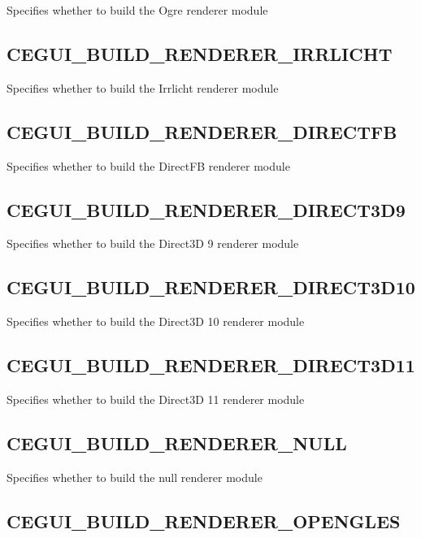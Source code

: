 Specifies whether to build the Ogre renderer module \hypertarget{build_options_build_options_irr_renderer}{}\subsection{C\+E\+G\+U\+I\+\_\+\+B\+U\+I\+L\+D\+\_\+\+R\+E\+N\+D\+E\+R\+E\+R\+\_\+\+I\+R\+R\+L\+I\+C\+HT}\label{build_options_build_options_irr_renderer}
Specifies whether to build the Irrlicht renderer module \hypertarget{build_options_build_options_dfb_renderer}{}\subsection{C\+E\+G\+U\+I\+\_\+\+B\+U\+I\+L\+D\+\_\+\+R\+E\+N\+D\+E\+R\+E\+R\+\_\+\+D\+I\+R\+E\+C\+T\+FB}\label{build_options_build_options_dfb_renderer}
Specifies whether to build the Direct\+FB renderer module \hypertarget{build_options_build_options_d3d9_renderer}{}\subsection{C\+E\+G\+U\+I\+\_\+\+B\+U\+I\+L\+D\+\_\+\+R\+E\+N\+D\+E\+R\+E\+R\+\_\+\+D\+I\+R\+E\+C\+T3\+D9}\label{build_options_build_options_d3d9_renderer}
Specifies whether to build the Direct3D 9 renderer module \hypertarget{build_options_build_options_d3d10_renderer}{}\subsection{C\+E\+G\+U\+I\+\_\+\+B\+U\+I\+L\+D\+\_\+\+R\+E\+N\+D\+E\+R\+E\+R\+\_\+\+D\+I\+R\+E\+C\+T3\+D10}\label{build_options_build_options_d3d10_renderer}
Specifies whether to build the Direct3D 10 renderer module \hypertarget{build_options_build_options_d3d11_renderer}{}\subsection{C\+E\+G\+U\+I\+\_\+\+B\+U\+I\+L\+D\+\_\+\+R\+E\+N\+D\+E\+R\+E\+R\+\_\+\+D\+I\+R\+E\+C\+T3\+D11}\label{build_options_build_options_d3d11_renderer}
Specifies whether to build the Direct3D 11 renderer module \hypertarget{build_options_build_options_null_renderer}{}\subsection{C\+E\+G\+U\+I\+\_\+\+B\+U\+I\+L\+D\+\_\+\+R\+E\+N\+D\+E\+R\+E\+R\+\_\+\+N\+U\+LL}\label{build_options_build_options_null_renderer}
Specifies whether to build the null renderer module \hypertarget{build_options_build_options_gles1_1_renderer}{}\subsection{C\+E\+G\+U\+I\+\_\+\+B\+U\+I\+L\+D\+\_\+\+R\+E\+N\+D\+E\+R\+E\+R\+\_\+\+O\+P\+E\+N\+G\+L\+ES}\label{build_options_build_options_gles1_1_renderer}
